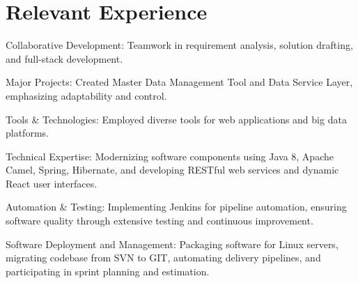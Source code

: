 \documentclass[]{plushcv}
\begin{document}
\begin{minipage}[t]{0.70\textwidth} 



\section{Relevant Experience}
\vspace{\topsep} %
\begin{tightemize}
\sectionsep
\item Collaborative Development: Teamwork in requirement analysis, solution drafting, and full-stack development.
\item Major Projects: Created Master Data Management Tool and Data Service Layer, emphasizing adaptability and control. \item Tools & Technologies: Employed diverse tools for web applications and big data platforms.
\end{tightemize}
\sectionsep

\begin{tightemize}
\sectionsep
\item Technical Expertise: Modernizing software components using Java 8, Apache Camel, Spring, Hibernate, and developing RESTful web services and dynamic React user interfaces.
\item Automation & Testing: Implementing Jenkins for pipeline automation, ensuring software quality through extensive testing and continuous improvement.
\item Software Deployment and Management: Packaging software for Linux servers, migrating codebase from SVN to GIT, automating delivery pipelines, and participating in sprint planning and estimation.
\end{tightemize}
\sectionsep


\end{minipage}
\end{document}
